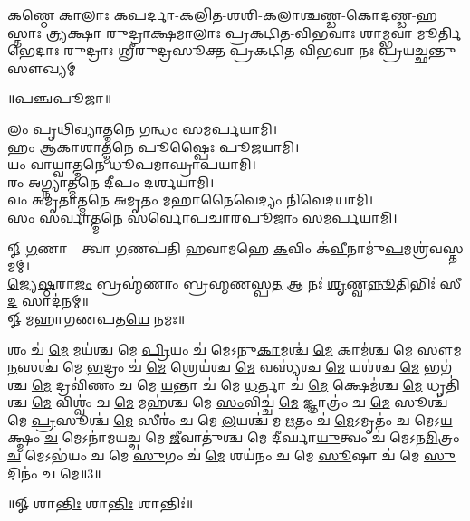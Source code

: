 {𑌕𑌣𑍍𑌠𑍇 𑌕𑌾𑌲𑌾𑌃 𑌕𑌪𑌰𑍍𑌦𑌾-𑌕𑌲𑌿𑌤-𑌶𑌶𑌿-𑌕𑌲𑌾𑌶𑍍𑌚𑌣𑍍𑌡-𑌕𑍋𑌦𑌣𑍍𑌡-𑌹𑌸𑍍𑌤𑌾𑌃}
{𑌤𑍍𑌰𑍍𑌯𑌕𑍍𑌷𑌾 𑌰𑍁𑌦𑍍𑌰𑌾𑌕𑍍𑌷𑌮𑌾𑌲𑌾𑌃 𑌪𑍍𑌰𑌕𑌟𑌿𑌤-𑌵𑌿𑌭𑌵𑌾𑌃 𑌶𑌾𑌮𑍍𑌭𑌵𑌾 𑌮𑍂𑌰𑍍𑌤𑌿𑌭𑍇𑌦𑌾𑌃}
{𑌰𑍁𑌦𑍍𑌰𑌾𑌃 𑌶𑍍𑌰𑍀𑌰𑍁𑌦𑍍𑌰𑌸𑍂𑌕𑍍𑌤-𑌪𑍍𑌰𑌕𑌟𑌿𑌤-𑌵𑌿𑌭𑌵𑌾 𑌨𑌃 𑌪𑍍𑌰𑌯𑌚𑍍𑌛𑌨𑍍𑌤𑍁 𑌸𑍗𑌖𑍍𑌯𑌮𑍍}

\centerline{॥𑌪𑌞𑍍𑌚𑌪𑍂𑌜𑌾॥}

𑌲𑌂 𑌪𑍃𑌥𑌿𑌵𑍍𑌯𑌾𑌤𑍍𑌮𑌨𑍇 𑌗𑌨𑍍𑌧𑌂 𑌸𑌮𑌰𑍍𑌪𑌯𑌾𑌮𑌿।\\
𑌹𑌂 𑌆𑌕𑌾𑌶𑌾𑌤𑍍𑌮𑌨𑍇 𑌪𑍂𑌷𑍍𑌪𑍈𑌃 𑌪𑍂𑌜𑌯𑌾𑌮𑌿।\\
𑌯𑌂 𑌵𑌾𑌯𑍍𑌵𑌾𑌤𑍍𑌮𑌨𑍇 𑌧𑍂𑌪𑌮𑌾𑌘𑍍𑌰𑌾𑌪𑌯𑌾𑌮𑌿।\\
𑌰𑌂 𑌅𑌗𑍍𑌨𑍍𑌯𑌾𑌤𑍍𑌮𑌨𑍇 𑌦𑍀𑌪𑌂 𑌦𑌰𑍍𑌶𑌯𑌾𑌮𑌿।\\
𑌵𑌂 𑌅𑌮𑍃𑌤𑌾𑌤𑍍𑌮𑌨𑍇 𑌅𑌮𑍃𑌤𑌂 𑌮𑌹𑌾𑌨𑍈𑌵𑍇𑌦𑍍𑌯𑌂 𑌨𑌿𑌵𑍇𑌦𑌯𑌾𑌮𑌿।\\
𑌸𑌂 𑌸𑌰𑍍𑌵𑌾𑌤𑍍𑌮𑌨𑍇 𑌸𑌰𑍍𑌵𑍋𑌪𑌚𑌾𑌰𑌪𑍂𑌜𑌾𑌂 𑌸𑌮𑌰𑍍𑌪𑌯𑌾𑌮𑌿।

𑍐 \ul{𑌗}𑌣𑌾𑌨𑌾𑌂᳚ 𑌤𑍍𑌵𑌾 \ul{𑌗}𑌣𑌪॑𑌤𑌿 𑌹𑌵𑌾𑌮𑌹𑍇 \ul{𑌕}𑌵𑌿𑌂 𑌕॑\ul{𑌵𑍀}𑌨𑌾𑌮𑍁॑\ul{𑌪}\-𑌮𑌶𑍍𑌰॑𑌵𑌸𑍍𑌤𑌮𑌮𑍍। \\
\ul{𑌜𑍍𑌯𑍇}\ul{𑌷𑍍𑌠}𑌰𑌾\ul{𑌜𑌂} 𑌬𑍍𑌰𑌹𑍍𑌮॑𑌣𑌾𑌂 𑌬𑍍𑌰𑌹𑍍𑌮𑌣𑌸𑍍𑌪\ul{𑌤} 𑌆 𑌨𑌃॑ \ul{𑌶𑍃}𑌣𑍍𑌵\ul{𑌨𑍍𑌨𑍂}𑌤𑌿𑌭𑌿𑌃॑ 𑌸𑍀\ul{𑌦} 𑌸𑌾𑌦॑𑌨𑌮𑍍॥ \\
𑍐 𑌮𑌹𑌾𑌗𑌣𑌪𑌤\ul{𑌯𑍇} 𑌨𑌮𑌃॥ 


𑌶𑌂 𑌚॑ \ul{𑌮𑍇} 𑌮𑌯॑𑌶𑍍𑌚 𑌮𑍇 \ul{𑌪𑍍𑌰𑌿}𑌯𑌂 𑌚॑ 𑌮𑍇𑌽𑌨𑍁\ul{𑌕𑌾}𑌮𑌶𑍍𑌚॑ \ul{𑌮𑍇} 𑌕𑌾𑌮॑𑌶𑍍𑌚 𑌮𑍇 𑌸𑍗𑌮\ul{𑌨}𑌸𑌶𑍍𑌚॑ 𑌮𑍇 \ul{𑌭}𑌦𑍍𑌰𑌂 𑌚॑ \ul{𑌮𑍇} 𑌶𑍍𑌰𑍇𑌯॑𑌶𑍍𑌚 \ul{𑌮𑍇} 𑌵𑌸𑍍𑌯॑𑌶𑍍𑌚 \ul{𑌮𑍇} 𑌯𑌶॑𑌶𑍍𑌚 \ul{𑌮𑍇} 𑌭𑌗॑𑌶𑍍𑌚 \ul{𑌮𑍇} 𑌦𑍍𑌰𑌵𑌿॑𑌣𑌂 𑌚 𑌮𑍇 \ul{𑌯}𑌨𑍍𑌤𑌾 𑌚॑ 𑌮𑍇 \ul{𑌧}𑌰𑍍𑌤𑌾 𑌚॑ \ul{𑌮𑍇} 𑌕𑍍𑌷𑍇𑌮॑𑌶𑍍𑌚 \ul{𑌮𑍇} 𑌧𑍃𑌤𑌿॑𑌶𑍍𑌚 \ul{𑌮𑍇} 𑌵𑌿𑌶𑍍𑌵𑌂॑ 𑌚 \ul{𑌮𑍇} 𑌮𑌹॑𑌶𑍍𑌚 𑌮𑍇 \ul{𑌸𑌂}𑌵𑌿𑌚𑍍𑌚॑ \ul{𑌮𑍇} 𑌜𑍍𑌞𑌾𑌤𑍍𑌰𑌂॑ 𑌚 \ul{𑌮𑍇} 𑌸𑍂𑌶𑍍𑌚॑ 𑌮𑍇 \ul{𑌪𑍍𑌰}𑌸𑍂𑌶𑍍𑌚॑ \ul{𑌮𑍇} 𑌸𑍀𑌰𑌂॑ 𑌚 𑌮𑍇 \ul{𑌲}𑌯𑌶𑍍𑌚॑ 𑌮 \ul{𑌋}𑌤𑌂 𑌚॑ \ul{𑌮𑍇}𑌽𑌮𑍃𑌤𑌂॑ 𑌚 𑌮𑍇𑌽\ul{𑌯}𑌕𑍍𑌷𑍍𑌮𑌂 \ul{𑌚} 𑌮𑍇𑌽𑌨𑌾॑𑌮𑌯𑌚𑍍𑌚 𑌮𑍇 \ul{𑌜𑍀}𑌵𑌾𑌤𑍁॑𑌶𑍍𑌚 𑌮𑍇 𑌦𑍀𑌰𑍍𑌘𑌾\ul{𑌯𑍁}𑌤𑍍𑌵𑌂 𑌚॑ 𑌮𑍇𑌽𑌨\ul{𑌮𑌿}𑌤𑍍𑌰𑌂 \ul{𑌚} 𑌮𑍇𑌽𑌭॑𑌯𑌂 𑌚 𑌮𑍇 \ul{𑌸𑍁}𑌗𑌂 𑌚॑ \ul{𑌮𑍇} 𑌶𑌯॑𑌨𑌂 𑌚 𑌮𑍇 \ul{𑌸𑍂}𑌷𑌾 𑌚॑ 𑌮𑍇 \ul{𑌸𑍁}𑌦𑌿𑌨𑌂॑ 𑌚 𑌮𑍇॥3॥ 
\centerline{॥𑍐 𑌶𑌾\ul{𑌨𑍍𑌤𑌿𑌃} 𑌶𑌾\ul{𑌨𑍍𑌤𑌿𑌃} 𑌶𑌾𑌨𑍍𑌤𑌿𑌃॑॥}

{\small \closesection}



